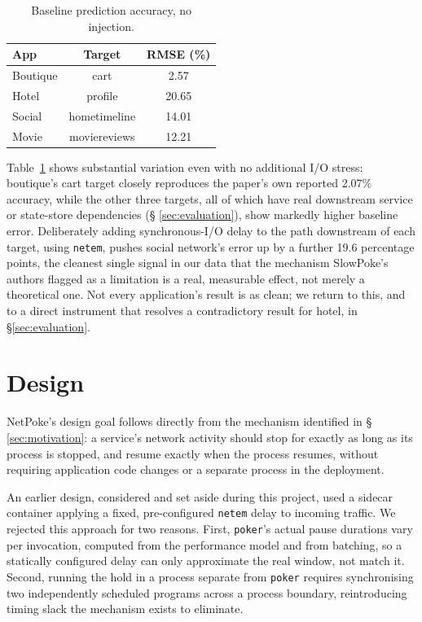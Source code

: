 \begin{table}[t]
\centering
\small
\caption{Baseline prediction accuracy, no injection.}
\label{tab:baseline}
\begin{tabular}{lcc}
\toprule
App & Target & RMSE (\%) \\
\midrule
Boutique & cart & 2.57 \\
Hotel & profile & 20.65 \\
Social & hometimeline & 14.01 \\
Movie & moviereviews & 12.21 \\
\bottomrule
\end{tabular}
\end{table}

Table~\ref{tab:baseline} shows substantial variation even with no
additional I/O stress: boutique's cart target closely reproduces the
paper's own reported 2.07\% accuracy, while the other three targets, all
of which have real downstream service or state-store dependencies (\S
\ref{sec:evaluation}), show markedly higher baseline error. Deliberately
adding synchronous-I/O delay to the path downstream of each target, using
\texttt{netem}, pushes social network's error up by a further 19.6
percentage points, the cleanest single signal in our data that the
mechanism SlowPoke's authors flagged as a limitation is a real,
measurable effect, not merely a theoretical one. Not every application's
result is as clean; we return to this, and to a direct instrument that
resolves a contradictory result for hotel, in \S\ref{sec:evaluation}.

\section{Design}
\label{sec:design}

NetPoke's design goal follows directly from the mechanism identified in \S
\ref{sec:motivation}: a service's network activity should stop for exactly
as long as its process is stopped, and resume exactly when the process
resumes, without requiring application code changes or a separate process
in the deployment.

An earlier design, considered and set aside during this project, used a
sidecar container applying a fixed, pre-configured \texttt{netem} delay to
incoming traffic. We rejected this approach for two reasons. First,
\texttt{poker}'s actual pause durations vary per invocation, computed from
the performance model and from batching, so a statically configured delay
can only approximate the real window, not match it. Second, running the
hold in a process separate from \texttt{poker} requires synchronising two
independently scheduled programs across a process boundary, reintroducing
timing slack the mechanism exists to eliminate.

